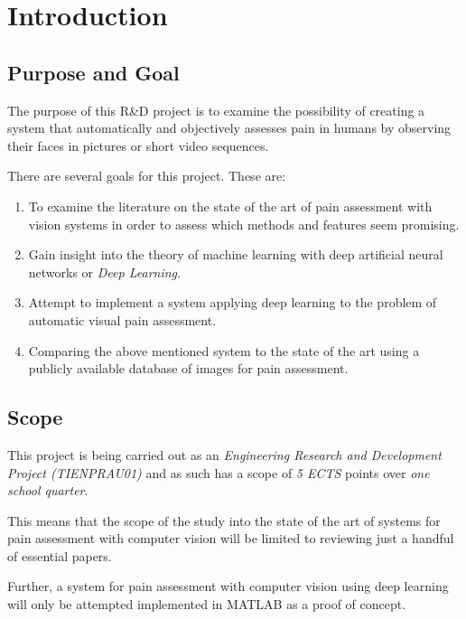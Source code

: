 \documentclass[Main]{subfiles}
\begin{document}
\section{Introduction} %
	\label{sec:introduction}

	\subsection{Purpose and Goal} %
		\label{sub:purpose_and_goal}
		The purpose of this R\&D project is to examine the possibility of creating a system that automatically and objectively  assesses pain in humans by observing their faces in pictures or short video sequences.

		There are several goals for this project.
		These are:
		\begin{enumerate}
			\item 
				To examine the literature on the state of the art of pain assessment with vision systems in order to assess which methods and features seem promising.
			\item
				Gain insight into the theory of machine learning with deep artificial neural networks or \emph{Deep Learning}.
			\item
				Attempt to implement a system applying deep learning to the problem of automatic visual pain assessment.
			\item 
				Comparing the above mentioned system to the state of the art using a publicly available database of images for pain assessment.
		\end{enumerate}


	\subsection{Scope} %
		\label{sub:scope}
		This project is being carried out as an \emph{Engineering Research and Development Project (TIENPRAU01)} and as such has a scope of \emph{5 ECTS} points over \emph{one school quarter}.

		This means that the scope of the study into the state of the art of systems for pain assessment with computer vision will be limited to reviewing just a handful of essential papers.

		Further, a system for pain assessment with computer vision using deep learning will only be attempted implemented in MATLAB as a proof of concept.


\end{document}
